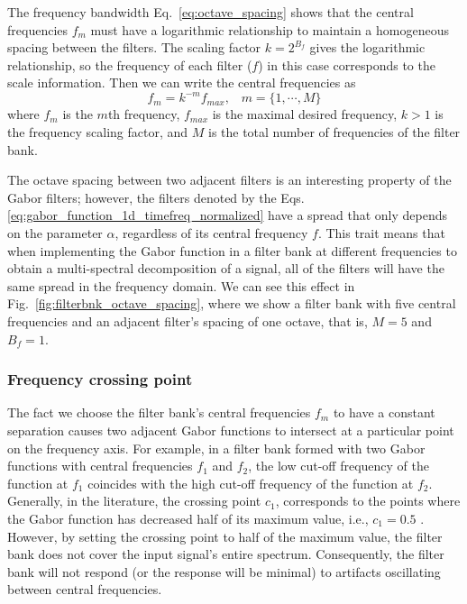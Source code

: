 The frequency bandwidth Eq.\ \eqref{eq:octave_spacing} shows that the central frequencies $f_m$ must have a logarithmic relationship to maintain a homogeneous spacing between the filters. The scaling factor $k=2^{B_f}$ gives the logarithmic relationship, so the frequency of each filter ($f$) in this case corresponds to the scale information. Then we can write the central frequencies as
\begin{equation}
	f_m = k^{-m} f_{max}\textrm{,} \quad m = \{1, \cdots, M\} \label{eq:filterbank_frequencies}
\end{equation} 
where $f_m$ is the $m$th frequency, $f_{max}$ is the maximal desired frequency, $k>1$ is the frequency scaling factor, and $M$ is the total number of frequencies of the filter bank.

The octave spacing between two adjacent filters is an interesting property of the Gabor filters; however, the filters denoted by the Eqs. \eqref{eq:gabor_function_1d_timefreq_normalized} have a spread that only depends on the parameter $\alpha$, regardless of its central frequency $f$. This trait means that when implementing the Gabor function in a filter bank at different frequencies to obtain a multi-spectral decomposition of a signal, all of the filters will have the same spread in the frequency domain. We can see this effect in Fig.\ \ref{fig:filterbnk_octave_spacing}, where we show a filter bank with five central frequencies and an adjacent filter's spacing of one octave, that is, $M=5$ and $B_f = 1$. 


\subsubsection{Frequency crossing point}
The fact we choose the filter bank's central frequencies $f_m$ to have a constant separation causes two adjacent Gabor functions to intersect at a particular point on the frequency axis. For example, in a filter bank formed with two Gabor functions with central frequencies $f_1$ and $f_2$, the low cut-off frequency of the function at $f_1$ coincides with the high cut-off frequency of the function at $f_2$. Generally, in the literature, the crossing point $c_1$, corresponds to the points where the Gabor function has decreased half of its maximum value, i.e., $c_1=0.5$ \citep{Granlund:CGIP:1978}. However, by setting the crossing point to half of the maximum value, the filter bank does not cover the input signal's entire spectrum. Consequently, the filter bank will not respond (or the response will be minimal) to artifacts oscillating between central frequencies.

